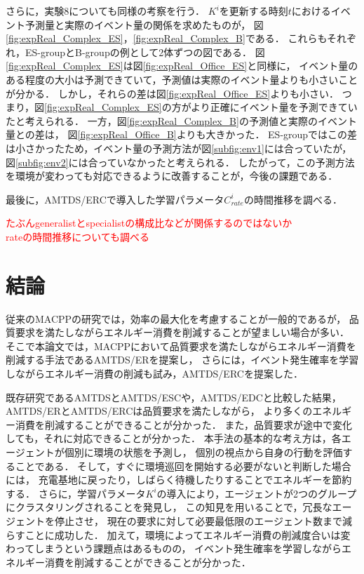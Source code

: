 \documentclass[12pt,a4j,twoside]{jarticle}
\def\red#1{\textcolor{red}{#1}}
\begin{document}
  さらに，実験8についても同様の考察を行う．
  $K^i$を更新する時刻$t$におけるイベント予測量と実際のイベント量の関係を求めたものが，
  図\ref{fig:expReal_Complex_ES}，\ref{fig:expReal_Complex_B}である．
  これらもそれぞれ，ES-groupとB-groupの例として2体ずつの図である．
  図\ref{fig:expReal_Complex_ES}は図\ref{fig:expReal_Office_ES}と同様に，
  イベント量のある程度の大小は予測できていて，予測値は実際のイベント量よりも小さいことが分かる．
  しかし，それらの差は図\ref{fig:expReal_Office_ES}よりも小さい．
  つまり，図\ref{fig:expReal_Complex_ES}の方がより正確にイベント量を予測できていたと考えられる．
  一方，図\ref{fig:expReal_Complex_B}の予測値と実際のイベント量との差は，
  図\ref{fig:expReal_Office_B}よりも大きかった．
  ES-groupではこの差は小さかったため，イベント量の予測方法が図\ref{subfig:env1}には合っていたが，
  図\ref{subfig:env2}には合っていなかったと考えられる．
  したがって，この予測方法を環境が変わっても対応できるように改善することが，今後の課題である．
  \par

  最後に，AMTDS/ERCで導入した学習パラメータ$C^i_{rate}$の時間推移を調べる．

  
  \red{たぶんgeneralistとspecialistの構成比などが関係するのではないか}\\
  \red{rateの時間推移についても調べる}
  \section{結論}
  従来のMACPPの研究では，効率の最大化を考慮することが一般的であるが，
  品質要求を満たしながらエネルギー消費を削減することが望ましい場合が多い．
  そこで本論文では，MACPPにおいて品質要求を満たしながらエネルギー消費を削減する手法であるAMTDS/ERを提案し，
  さらには，イベント発生確率を学習しながらエネルギー消費の削減も試み，AMTDS/ERCを提案した．
  \par

  既存研究であるAMTDSとAMTDS/ESCや，AMTDS/EDCと比較した結果，AMTDS/ERとAMTDS/ERCは品質要求を満たしながら，
  より多くのエネルギー消費を削減することができることが分かった．
  また，品質要求が途中で変化しても，それに対応できることが分かった．
  本手法の基本的な考え方は，各エージェントが個別に環境の状態を予測し，
  個別の視点から自身の行動を評価することである．
  そして，すぐに環境巡回を開始する必要がないと判断した場合には，
  充電基地に戻ったり，しばらく待機したりすることでエネルギーを節約する．
  さらに，学習パラメータ$K^i$の導入により，エージェントが2つのグループにクラスタリングされることを発見し，
  この知見を用いることで，冗長なエージェントを停止させ，
  現在の要求に対して必要最低限のエージェント数まで減らすことに成功した．
  加えて，環境によってエネルギー消費の削減度合いは変わってしまうという課題点はあるものの，
  イベント発生確率を学習しながらエネルギー消費を削減することができることが分かった．
  \par
\end{document}
